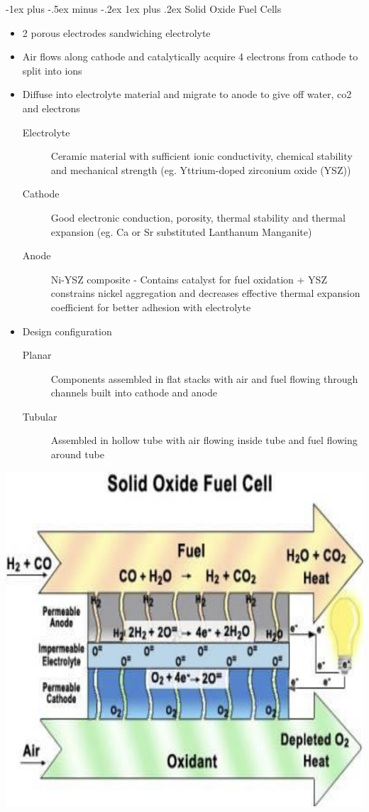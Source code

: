 \documentclass{article}
\makeatletter
\renewcommand{\subsubsection}{\@startsection{subsubsection}{3}{0mm}%
    {-1ex plus -.5ex minus -.2ex}%
    {1ex plus .2ex}%
{\normalfont\small\bfseries}}%
\makeatother
\begin{document}
\begin{multicols*}{4}
\subsubsection{Solid Oxide Fuel Cells}
\begin{itemize}
	\item 2 porous electrodes sandwiching electrolyte
	\item Air flows along cathode and catalytically acquire 4 electrons from cathode to split into ions
	\item Diffuse into electrolyte material and migrate to anode to give off water, co2 and electrons
	\begin{description}
		\item[Electrolyte]{Ceramic material with sufficient ionic conductivity, chemical stability and mechanical strength (eg. Yttrium-doped zirconium oxide (YSZ))}
		\item[Cathode]{Good electronic conduction, porosity, thermal stability and thermal expansion (eg. Ca or Sr substituted Lanthanum Manganite)}
		\item[Anode]{Ni-YSZ composite - Contains catalyst for fuel oxidation + YSZ constrains nickel aggregation and decreases effective thermal expansion coefficient for better adhesion with electrolyte}
	\end{description}
	\item Design configuration
	\begin{description}
		\item[Planar]{Components assembled in flat stacks with air and fuel flowing through channels built into cathode and anode}
		\item[Tubular]{Assembled in hollow tube with air flowing inside tube and fuel flowing around tube}
	\end{description}
\end{itemize}
\includegraphics[scale=0.2]{solid-oxide-fc}

\end{multicols*}
\end{document}
